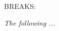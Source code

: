 \documentclass[11pt]{book}
\begin{document}
BREAKS:

 \textit{
 The following ...
 }
\end{document}
